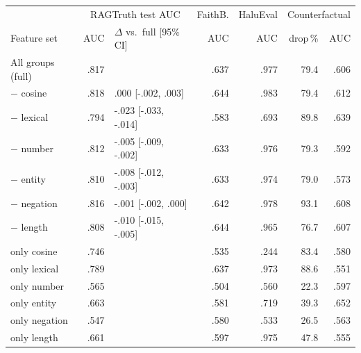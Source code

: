 \begin{tabular}{lrlrrrr}
\toprule
 & \multicolumn{2}{c}{RAGTruth test AUC} & FaithB. & HaluEval & \multicolumn{2}{c}{Counterfactual} \\
Feature set & AUC & $\Delta$ vs.\ full [95\% CI] & AUC & AUC & drop\,\% & AUC \\
\midrule
All groups (full) & .817 &  & .637 & .977 & 79.4 & .606 \\
\midrule
$-$ cosine & .818 & .000 [-.002, .003] & .644 & .983 & 79.4 & .612 \\
$-$ lexical & .794 & -.023 [-.033, -.014] & .583 & .693 & 89.8 & .639 \\
$-$ number & .812 & -.005 [-.009, -.002] & .633 & .976 & 79.3 & .592 \\
$-$ entity & .810 & -.008 [-.012, -.003] & .633 & .974 & 79.0 & .573 \\
$-$ negation & .816 & -.001 [-.002, .000] & .642 & .978 & 93.1 & .608 \\
$-$ length & .808 & -.010 [-.015, -.005] & .644 & .965 & 76.7 & .607 \\
\midrule
only cosine & .746 &  & .535 & .244 & 83.4 & .580 \\
only lexical & .789 &  & .637 & .973 & 88.6 & .551 \\
only number & .565 &  & .504 & .560 & 22.3 & .597 \\
only entity & .663 &  & .581 & .719 & 39.3 & .652 \\
only negation & .547 &  & .580 & .533 & 26.5 & .563 \\
only length & .661 &  & .597 & .975 & 47.8 & .555 \\
\bottomrule
\end{tabular}
